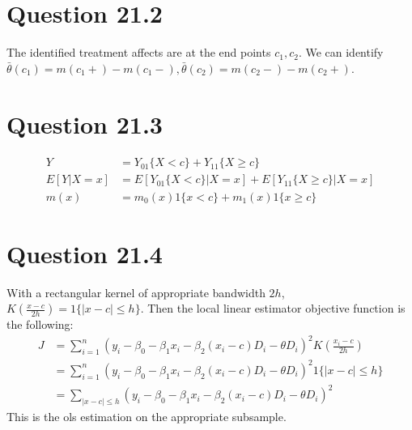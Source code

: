 \documentclass[11pt]{article} %
\begin{document}
\section{Question 21.2}
The identified treatment affects are at the end points $c_1,c_2$. We can identify $\bar{\theta}(c_1) = m(c_1+)-m(c_1-), \bar{\theta}(c_2) = m(c_2-) - m(c_2+)$.
\section{Question 21.3}
\begin{align*}
Y &= Y_01\{X<c\} + Y_11\{X\geq c\}\\
E[Y|X=x] &= E[Y_01\{X<c\}|X=x] + E[Y_11\{X\geq c\}|X=x]\\
m(x) &= m_0(x)1\{x<c\} + m_1(x)1\{x\geq c\}
\end{align*}
\section{Question 21.4}
With a rectangular kernel of appropriate bandwidth $2h$, $K\left(\frac{x - c}{2h}\right) = 1\{ |x - c| \leq h\}$. Then the local linear estimator objective function is the following:
\begin{align*}
J &= \sum_{i=1}^n (y_i - \beta_0 - \beta_1x_i - \beta_2(x_i-c)D_i - \theta D_i)^2K\left(\frac{x_i - c}{2h}\right)\\
&=  \sum_{i=1}^n (y_i - \beta_0 - \beta_1x_i - \beta_2(x_i-c)D_i - \theta D_i)^2 1\{ |x - c| \leq h\} \\
&=  \sum_{|x - c| \leq h} (y_i - \beta_0 - \beta_1x_i - \beta_2(x_i-c)D_i - \theta D_i)^2 
\end{align*}
This is the ols estimation on the appropriate subsample.
\end{document}
